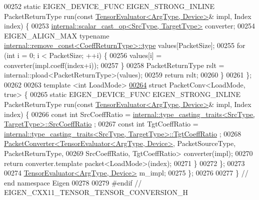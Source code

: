 \begin{DoxyCode}
00252     \textcolor{keyword}{static} EIGEN\_DEVICE\_FUNC EIGEN\_STRONG\_INLINE PacketReturnType run(\textcolor{keyword}{const} 
      \hyperlink{struct_eigen_1_1_tensor_evaluator}{TensorEvaluator<ArgType, Device>}& impl, Index index) \{
00253       \hyperlink{struct_eigen_1_1internal_1_1scalar__cast__op}{internal::scalar\_cast\_op<SrcType, TargetType>} converter;
00254       EIGEN\_ALIGN\_MAX \textcolor{keyword}{typename} \hyperlink{group___sparse_core___module}{internal::remove\_const<CoeffReturnType>::type}
       values[PacketSize];
00255       \textcolor{keywordflow}{for} (\textcolor{keywordtype}{int} i = 0; i < PacketSize; ++i) \{
00256         values[i] = converter(impl.coeff(index+i));
00257       \}
00258       PacketReturnType rslt = internal::pload<PacketReturnType>(values);
00259       \textcolor{keywordflow}{return} rslt;
00260     \}
00261   \};
00262 
00263   \textcolor{keyword}{template} <\textcolor{keywordtype}{int} LoadMode>
\hyperlink{struct_eigen_1_1_tensor_evaluator_3_01const_01_tensor_conversion_op_3_01_target_type_00_01_arg_t2fb5a078ff43de9fbe10110949df4d26}{00264}   \textcolor{keyword}{struct }PacketConv<LoadMode, true> \{
00265     \textcolor{keyword}{static} EIGEN\_DEVICE\_FUNC EIGEN\_STRONG\_INLINE PacketReturnType run(\textcolor{keyword}{const} 
      \hyperlink{struct_eigen_1_1_tensor_evaluator}{TensorEvaluator<ArgType, Device>}& impl, Index index) \{
00266       \textcolor{keyword}{const} \textcolor{keywordtype}{int} SrcCoeffRatio = 
      \hyperlink{struct_eigen_1_1internal_1_1type__casting__traits}{internal::type\_casting\_traits<SrcType, TargetType>::SrcCoeffRatio}
      ;
00267       \textcolor{keyword}{const} \textcolor{keywordtype}{int} TgtCoeffRatio = 
      \hyperlink{struct_eigen_1_1internal_1_1type__casting__traits}{internal::type\_casting\_traits<SrcType, TargetType>::TgtCoeffRatio}
      ;
00268       \hyperlink{struct_eigen_1_1_packet_converter}{PacketConverter<TensorEvaluator<ArgType, Device>}, 
      PacketSourceType, PacketReturnType,
00269                       SrcCoeffRatio, TgtCoeffRatio> converter(impl);
00270       \textcolor{keywordflow}{return} converter.template packet<LoadMode>(index);
00271     \}
00272   \};
00273 
00274   \hyperlink{struct_eigen_1_1_tensor_evaluator}{TensorEvaluator<ArgType, Device>} m\_impl;
00275 \};
00276 
00277 \} \textcolor{comment}{// end namespace Eigen}
00278 
00279 \textcolor{preprocessor}{#endif // EIGEN\_CXX11\_TENSOR\_TENSOR\_CONVERSION\_H}
\end{DoxyCode}
